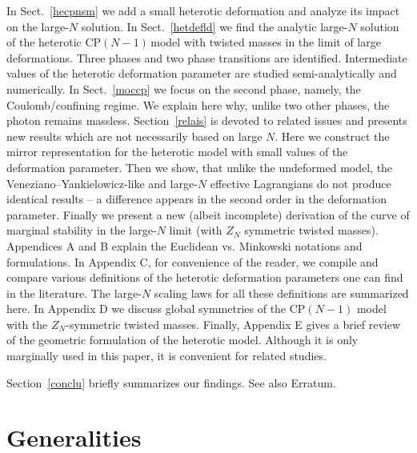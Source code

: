 \documentclass[epsfig,12pt]{article}
\newcommand{\cpn}{CP$(N-1)\,$}
\begin{document}
In Sect.~\ref{hecpnsm} we add a small heterotic deformation and analyze its impact on the
 large-$N$ solution. In Sect.~\ref{hetdefld} we find the
 analytic  large-$N$ solution of the heterotic \cpn model with twisted
masses in the limit of large deformations. 
Three phases and two phase transitions are identified. Intermediate values of the heterotic deformation parameter
are studied semi-analytically and numerically.
In Sect.~\ref{moccp} we focus on the second
phase, namely, the Coulomb/confining regime. 
We explain here why, unlike two other phases, the photon remains massless.
Section~\ref{relais} is devoted to related issues
and presents new results which are not necessarily based on  large $N$.
Here we construct 
the mirror representation for the heterotic  model with small values of the deformation parameter.
 Then we show, that unlike the undeformed model, the Veneziano--Yankielowicz-like and large-$N$ effective Lagrangians
 do not produce identical results -- a 
difference appears in the second order in the deformation parameter.
  Finally we present a new (albeit incomplete)
 derivation of the curve of marginal stability in the large-$N$ limit (with $Z_N$ symmetric twisted masses).
 Appendices A and B explain the Euclidean vs. Minkowski notations and formulations. In Appendix C, for convenience of the reader, we compile and compare various definitions of the heterotic deformation parameters one can find in the literature.
 The large-$N$ scaling laws for all these definitions are summarized here.
 In Appendix D
 we discuss global symmetries of the CP$(N-1)$ 
 model with the $Z_N$-symmetric twisted masses. Finally, Appendix E gives a brief review 
 of the geometric formulation of the heterotic model. Although it is only marginally used in this paper,
 it is convenient for related studies.

Section~\ref{conclu} briefly summarizes our findings. See also Erratum. 






\section{Generalities}
\label{genera}
\setcounter{equation}{0}
\end{document}

